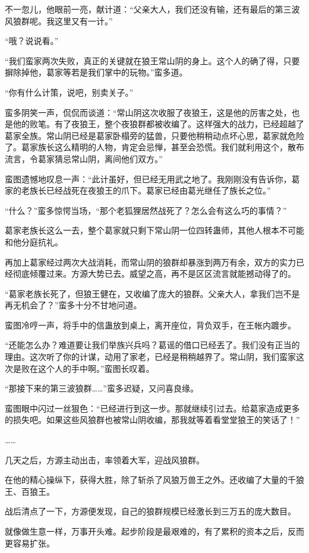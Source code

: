 \begin{this_body}
不一忽儿，他眼前一亮，献计道：“父亲大人，我们还没有输，还有最后的第三波风狼群呢。我这里又有一计。”

“哦？说说看。”

“我们蛮家两次失败，真正的关键就在狼王常山阴的身上。这个人的确了得，只要摒除掉他，葛家等若是我们掌中的玩物。”蛮多道。

“你有什么计策，说吧，别卖关子。”

蛮多阴笑一声，侃侃而谈道：“常山阴这次收服了夜狼王，这是他的厉害之处，也是他的败笔。有了夜狼王，整个夜狼群都被收编了。这样强大的战力，已经超越了葛家全族。常山阴已经是葛家卧榻旁的猛兽，只要他稍稍动点坏心思，葛家就危险了。葛家族长这么精明的人物，肯定会忌惮，甚至会恐慌。我们就利用这个，散布流言，令葛家猜忌常山阴，离间他们双方。”

蛮图遗憾地叹息一声：“此计虽好，但已经无用武之地了。我刚刚没有告诉你，葛家的老族长已经战死在夜狼王的爪下。葛家已经由葛光继任了族长之位。”

“什么？”蛮多惊愕当场，“那个老狐狸居然战死了？怎么会有这么巧的事情？”

葛家老族长这么一去，整个葛家就只剩下常山阴一位四转蛊师，其他人根本不可能和他分庭抗礼。

再加上葛家经过两次大战消耗，而常山阴的狼群却暴涨到两万有余，双方的实力已经彻底倾覆过来。方源大势已去。威望之高，再不是区区流言就能撼动得了的。

“葛家老族长死了，但狼王健在，又收编了庞大的狼群。父亲大人，拿我们岂不是再无机会了？”蛮多十分不甘地问道。

蛮图冷哼一声，将手中的信蛊放到桌上，离开座位，背负双手，在王帐内踱步。

“还能怎么办？难道要让我们举族兴兵吗？葛谣的借口已经丟了。我们没有正当的理由。这次听了你的计谋，动用了家老，已经是稍稍越界了。常山阴，我们蛮家这次是败在这个人的手中啊。”蛮图长叹着。

“那接下来的第三波狼群……”蛮多迟疑，又问喜良缘。

蛮图眼中闪过一丝狠色：“已经进行到这一步。那就继续引过去。给葛家造成更多的损失吧。如果这些风狼群也被常山阴收编，那我就等着看堂堂狼王的笑话了！”

……

几天之后，方源主动出击，率领着大军，迎战风狼群。

在他的精心操纵下，获得大胜，除了斩杀了风狼万兽王之外。还收编了大量的千狼王、百狼王。

战后清点了一下，方源便发现，自己的狼群规模已经激长到三万五的庞大数目。

就像做生意一样，万事开头难。起步阶段是最艰难的，有了累积的资本之后，反而更容易扩张。


\end{this_body}
